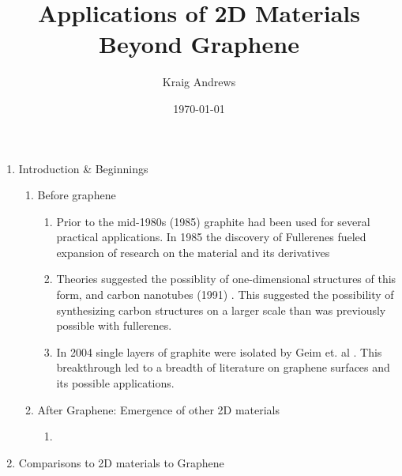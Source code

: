 \documentclass{article}
\author{Kraig Andrews}
\title{Applications of 2D Materials Beyond Graphene}
\date{\today}
\begin{document}
\maketitle

\begin{enumerate}%
	\item{ Introduction \& Beginnings
}
	\begin{enumerate} %
		\item{Before graphene}
			\begin{enumerate} %
				\item{Prior to the mid-1980s (1985) graphite had been used for several practical applications. In 1985 the discovery of Fullerenes fueled expansion of research on the material and its derivatives \cite{krotoFullerenes1985, nanoscaleReview2011}}
				\item{Theories suggested the possiblity of one-dimensional structures of this form, and carbon nanotubes (1991) \cite{iijimaCarbonNanotubes1991}. This suggested the possibility of synthesizing carbon structures on a larger scale than was previously possible with fullerenes.}
				\item{In 2004 single layers of graphite were isolated by Geim et. al \cite{novoselovEtAl2004, novoselovEtAl2005}. This breakthrough led to a breadth of literature on graphene surfaces and its possible applications.}
			\end{enumerate}	%
		\item{After Graphene: Emergence of other 2D materials}
			\begin{enumerate} %
				\item{}
			\end{enumerate} %
	\end{enumerate} %
	\item{Comparisons to 2D materials to Graphene}

\end{enumerate} %
\end{document}
